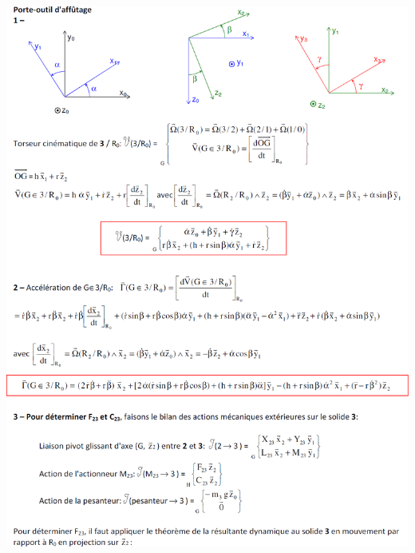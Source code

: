\documentclass[10pt,fleqn]{article} %
\begin{document}
\newpage

\begin{center}
\includegraphics[width=\linewidth]{images/cor_01}
\end{center}
\end{document}
